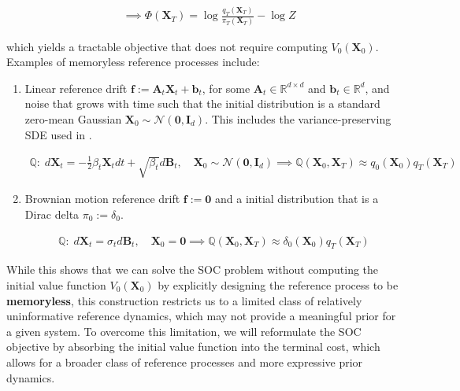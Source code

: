 \documentclass{article}
\begin{document}
{\begin{small}
\begin{align}
        &\implies \Phi(\boldsymbol{X}_T)=\log \frac{q_T(\boldsymbol{X}_T)}{\pi_T(\boldsymbol{X}_T)}-\log Z
    \end{align}
    \end{small}
    which yields a tractable objective that does not require computing $V_0(\boldsymbol{X}_0)$. Examples of memoryless reference processes include:
    \begin{enumerate}
        \item[(i)] Linear reference drift $\boldsymbol{f}:=\boldsymbol{A}_t\boldsymbol{X}_t +\boldsymbol{b}_t$, for some $\boldsymbol{A}_t\in \mathbb{R}^{d\times d}$ and $\boldsymbol{b}_t\in \mathbb{R}^d$, and noise that grows with time such that the initial distribution is a standard zero-mean Gaussian $\boldsymbol{X}_0\sim \mathcal{N}(\boldsymbol{0}, \boldsymbol{I}_d)$. This includes the variance-preserving SDE used in \citet{song2020score}.
        \begin{small}
        \begin{align}
            \mathbb{Q}:\;d\boldsymbol{X}_t=-\frac{1}{2}\beta_t\boldsymbol{X}_tdt +\sqrt{\beta_t}d\boldsymbol{B}_t, \quad \boldsymbol{X}_0\sim \mathcal{N}(\boldsymbol{0}, \boldsymbol{I}_d) \implies \mathbb{Q}(\boldsymbol{X}_0, \boldsymbol{X}_T)\approx q_0(\boldsymbol{X}_0)q_T(\boldsymbol{X}_T)\nonumber
        \end{align}
        \end{small}
        \item[(ii)] Brownian motion reference drift $\boldsymbol{f}:=\boldsymbol{0}$ and a initial distribution that is a Dirac delta $\pi_0:=\delta_0$.
        \begin{small}
        \begin{align}
            \mathbb{Q}:\;d\boldsymbol{X}_t=\sigma_td\boldsymbol{B}_t, \quad \boldsymbol{X}_0=\boldsymbol{0} \implies \mathbb{Q}(\boldsymbol{X}_0, \boldsymbol{X}_T)\approx \delta_0(\boldsymbol{X}_0)q_T(\boldsymbol{X}_T)\nonumber
        \end{align}
        \end{small}
    \end{enumerate}
}

While this shows that we can solve the SOC problem without computing the initial value function $V_0(\boldsymbol{X}_0)$ by explicitly designing the reference process to be \textbf{memoryless}, this construction restricts us to a limited class of relatively uninformative reference dynamics, which may not provide a meaningful prior for a given system. To overcome this limitation, we will reformulate the SOC objective by absorbing the initial value function into the terminal cost, which allows for a broader class of reference processes and more expressive prior dynamics.
\end{document}
